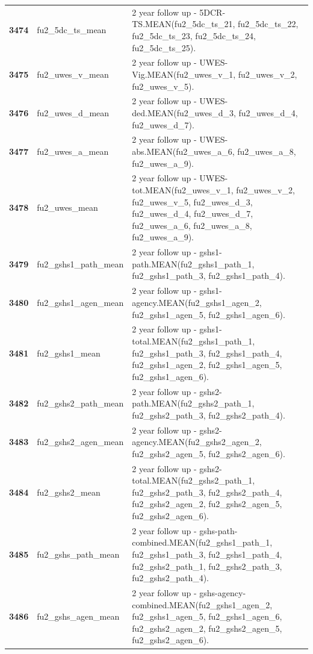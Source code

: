 \documentclass[
  letterpaper,
  DIV=11,
  numbers=noendperiod]{scrartcl}
\begin{document}
\begin{longtable}[t]{>{}cll}
\textbf{3474} & fu2\_5dc\_ts\_mean & 2 year follow up - 5DCR-TS.MEAN(fu2\_5dc\_ts\_21, fu2\_5dc\_ts\_22, fu2\_5dc\_ts\_23, fu2\_5dc\_ts\_24, fu2\_5dc\_ts\_25).\\
\textbf{3475} & fu2\_uwes\_v\_mean & 2 year follow up - UWES-Vig.MEAN(fu2\_uwes\_v\_1, fu2\_uwes\_v\_2, fu2\_uwes\_v\_5).\\
\addlinespace
\textbf{3476} & fu2\_uwes\_d\_mean & 2 year follow up - UWES-ded.MEAN(fu2\_uwes\_d\_3, fu2\_uwes\_d\_4, fu2\_uwes\_d\_7).\\
\textbf{3477} & fu2\_uwes\_a\_mean & 2 year follow up - UWES-abs.MEAN(fu2\_uwes\_a\_6, fu2\_uwes\_a\_8, fu2\_uwes\_a\_9).\\
\textbf{3478} & fu2\_uwes\_mean & 2 year follow up - UWES-tot.MEAN(fu2\_uwes\_v\_1, fu2\_uwes\_v\_2, fu2\_uwes\_v\_5, fu2\_uwes\_d\_3, fu2\_uwes\_d\_4, fu2\_uwes\_d\_7, fu2\_uwes\_a\_6, fu2\_uwes\_a\_8, fu2\_uwes\_a\_9).\\
\textbf{3479} & fu2\_gshs1\_path\_mean & 2 year follow up - gshs1-path.MEAN(fu2\_gshs1\_path\_1, fu2\_gshs1\_path\_3, fu2\_gshs1\_path\_4).\\
\textbf{3480} & fu2\_gshs1\_agen\_mean & 2 year follow up - gshs1-agency.MEAN(fu2\_gshs1\_agen\_2, fu2\_gshs1\_agen\_5, fu2\_gshs1\_agen\_6).\\
\addlinespace
\textbf{3481} & fu2\_gshs1\_mean & 2 year follow up - gshs1-total.MEAN(fu2\_gshs1\_path\_1, fu2\_gshs1\_path\_3, fu2\_gshs1\_path\_4, fu2\_gshs1\_agen\_2, fu2\_gshs1\_agen\_5, fu2\_gshs1\_agen\_6).\\
\textbf{3482} & fu2\_gshs2\_path\_mean & 2 year follow up - gshs2-path.MEAN(fu2\_gshs2\_path\_1, fu2\_gshs2\_path\_3, fu2\_gshs2\_path\_4).\\
\textbf{3483} & fu2\_gshs2\_agen\_mean & 2 year follow up - gshs2-agency.MEAN(fu2\_gshs2\_agen\_2, fu2\_gshs2\_agen\_5, fu2\_gshs2\_agen\_6).\\
\textbf{3484} & fu2\_gshs2\_mean & 2 year follow up - gshs2-total.MEAN(fu2\_gshs2\_path\_1, fu2\_gshs2\_path\_3, fu2\_gshs2\_path\_4, fu2\_gshs2\_agen\_2, fu2\_gshs2\_agen\_5, fu2\_gshs2\_agen\_6).\\
\textbf{3485} & fu2\_gshs\_path\_mean & 2 year follow up - gshs-path-combined.MEAN(fu2\_gshs1\_path\_1, fu2\_gshs1\_path\_3, fu2\_gshs1\_path\_4, fu2\_gshs2\_path\_1, fu2\_gshs2\_path\_3, fu2\_gshs2\_path\_4).\\
\addlinespace
\textbf{3486} & fu2\_gshs\_agen\_mean & 2 year follow up - gshs-agency-combined.MEAN(fu2\_gshs1\_agen\_2, fu2\_gshs1\_agen\_5, fu2\_gshs1\_agen\_6, fu2\_gshs2\_agen\_2, fu2\_gshs2\_agen\_5, fu2\_gshs2\_agen\_6).\\

\end{longtable}
\end{document}
